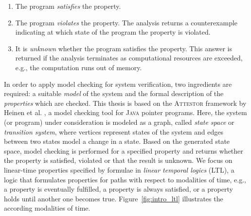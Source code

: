 \documentclass[a4paper, 12pt, twoside]{report}
\begin{document}
	\begin{enumerate}
		\item The program \textit{satisfies} the property.
		\item The program \textit{violates} the property. The analysis returns a counterexample indicating at which state of the program the property is violated. 		
		\item It is \textit{unknown} whether the program satisfies the property. This answer is returned if the analysis terminates as computational resources are exceeded, e.g., the computation runs out of memory.
	\end{enumerate}   

	In order to apply model checking for system verification, two ingredients are required: a suitable \textit{model} of the system and the formal description of the \textit{properties} which are checked. This thesis is based on the \textsc{Attestor} framework by Heinen et al. \cite{heinen2015juggrnaut}, a model checking tool for \textsc{Java} pointer programs. Here, the system (or program) under consideration is modeled as a graph, called \textit{state space} or \textit{transition system}, where vertices represent states of the system and edges between two states model a change in a state. Based on the generated state space, model checking is performed for a specified property and returns whether the property is satisfied, violated or that the result is unknown. We focus on linear-time properties specified by formulae in \textit{linear temporal logics} (LTL), a logic that formulates properties for paths with respect to modalities of time, e.g., a property is eventually fulfilled, a property is always satisfied, or a property holds until another one becomes true. Figure~\ref{fig:intro_ltl} illustrates the according modalities of time. \\
	
\end{document}
